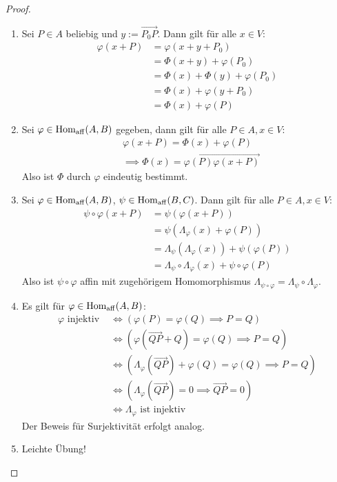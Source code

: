 \documentclass[parskip,a4paper,twoside,DIV15,BCOR12mm]{scrbook}
\begin{document}
\begin{proof}
\begin{enumerate}
\item Sei $P\in A$ beliebig und $y:=\overrightarrow{P_0P}$. Dann gilt für alle $x\in V$:
\begin{align*}
\varphi(x+P) &= \varphi(x+y+P_0)\\
&= \Phi(x+y)+\varphi(P_0)\\
&= \Phi(x)+\Phi(y)+\varphi(P_0)\\
&= \Phi(x)+\varphi(y+P_0)\\
&= \Phi(x)+\varphi(P)
\end{align*}
\item Sei $\varphi\in\operatorname{Hom_{aff}}(A,B)$ gegeben, dann gilt für alle $P\in A,x\in V$:
\begin{align*}
&\varphi(x+P)=\Phi(x)+\varphi(P)\\
&\implies \Phi(x)=\overrightarrow{\varphi(P)\varphi(x+P)}
\end{align*}
Also ist $\Phi$ durch $\varphi$ eindeutig bestimmt.
\item Sei $\varphi\in\operatorname{Hom_{aff}}(A,B)$, $\psi\in\operatorname{Hom_{aff}}(B,C)$. Dann gilt für alle $P\in A,x\in V$:
\begin{align*}
\psi\circ\varphi(x+P) &= \psi(\varphi(x+P))\\
&= \psi(\Lambda_\varphi(x)+\varphi(P))\\
&= \Lambda_\psi(\Lambda_\varphi(x))+\psi(\varphi(P))\\
&= \Lambda_\psi\circ\Lambda_\varphi(x)+\psi\circ\varphi(P)
\end{align*}
Also ist $\psi\circ\varphi$ affin mit zugehörigem Homomorphismus $\Lambda_{\psi\circ\varphi}=
\Lambda_\psi\circ\Lambda_\varphi$.
\item Es gilt für $\varphi\in\operatorname{Hom_{aff}}(A,B)$:
\begin{align*}
\varphi \text{ injektiv }&\iff (\varphi(P)=\varphi(Q) \implies P=Q)\\
&\iff (\varphi(\overrightarrow{QP}+Q)=\varphi(Q) \implies P=Q)\\
&\iff (\Lambda_\varphi(\overrightarrow{QP})+\varphi(Q)=\varphi(Q) \implies P=Q)\\
&\iff (\Lambda_\varphi(\overrightarrow{QP})=0 \implies \overrightarrow{QP}=0)\\
&\iff \Lambda_\varphi \text{ ist injektiv}
\end{align*}
Der Beweis für Surjektivität erfolgt analog.
\item Leichte Übung!
\end{enumerate}
\end{proof}
\end{document}
